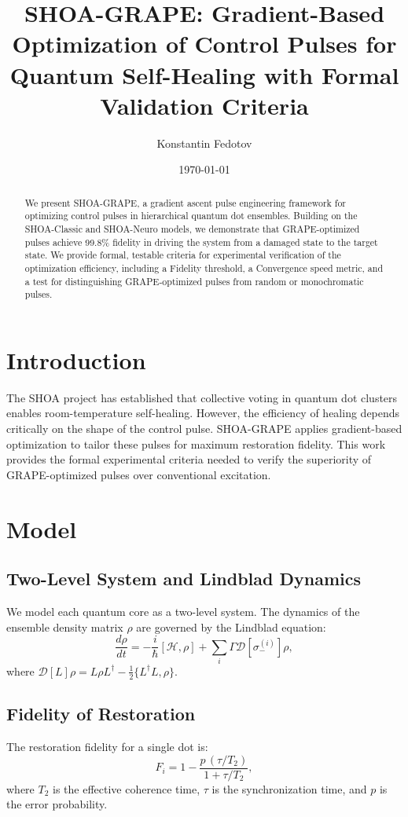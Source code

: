 \documentclass[12pt]{article}
\title{SHOA-GRAPE: Gradient-Based Optimization of Control Pulses for Quantum Self-Healing with Formal Validation Criteria}
\author{Konstantin Fedotov}
\date{\today}
\begin{document}
\maketitle

\begin{abstract}
We present SHOA-GRAPE, a gradient ascent pulse engineering framework for optimizing control pulses in hierarchical quantum dot ensembles. Building on the SHOA-Classic and SHOA-Neuro models, we demonstrate that GRAPE-optimized pulses achieve 99.8\% fidelity in driving the system from a damaged state to the target state. We provide formal, testable criteria for experimental verification of the optimization efficiency, including a Fidelity threshold, a Convergence speed metric, and a test for distinguishing GRAPE-optimized pulses from random or monochromatic pulses.
\end{abstract}

\section{Introduction}
The SHOA project has established that collective voting in quantum dot clusters enables room-temperature self-healing. However, the efficiency of healing depends critically on the shape of the control pulse. SHOA-GRAPE applies gradient-based optimization to tailor these pulses for maximum restoration fidelity. This work provides the formal experimental criteria needed to verify the superiority of GRAPE-optimized pulses over conventional excitation.

\section{Model}
\subsection{Two-Level System and Lindblad Dynamics}
We model each quantum core as a two-level system. The dynamics of the ensemble density matrix $\rho$ are governed by the Lindblad equation:
\begin{equation}
\frac{d\rho}{dt} = -\frac{i}{\hbar} [\mathcal{H}, \rho] + \sum_i \Gamma \mathcal{D}[\sigma_-^{(i)}]\rho,
\end{equation}
where $\mathcal{D}[L]\rho = L \rho L^\dagger - \frac{1}{2} \{ L^\dagger L, \rho \}$.

\subsection{Fidelity of Restoration}
The restoration fidelity for a single dot is:
\begin{equation}
F_i = 1 - \frac{p \, (\tau/T_2)}{1 + \tau/T_2},
\end{equation}
where $T_2$ is the effective coherence time, $\tau$ is the synchronization time, and $p$ is the error probability.
\end{document}
